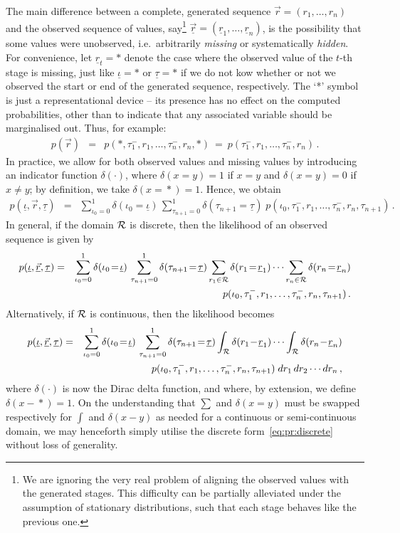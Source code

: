 \documentclass[a4paper]{article}
\newcommand{\ui}{\underline{\iota}}
\newcommand{\ut}{\underline{\tau}}
\newcommand{\ur}{\underline{r}}
\newcommand{\vr}{\vec{r}}
\newcommand{\uvr}{\underline{\vr}}
\newcommand{\tm}{\tau^{-}}
\begin{document}
The main difference between a complete, generated sequence $\vr=(r_1,\ldots,r_n)$
and the observed sequence of values, say\footnote{We are ignoring the very real problem
of aligning the observed values with the generated stages. This difficulty can be partially alleviated under the assumption of stationary distributions, such that each stage behaves
like the previous one.} 
$\uvr=(\ur_1,\ldots,\ur_n)$, 
is the possibility that some values were unobserved, i.e.\ arbitrarily {\em missing} or systematically {\em hidden}.
For convenience, let $\ur_t=*$ denote the case where the  observed value of the $t$-th stage is missing,
just like $\ui=*$ or $\ut=*$ if we do not kow whether or not we observed the start or end of the generated sequence,
respectively.
The `*' symbol is just a representational device -- its presence has no effect on the computed probabilities, other than to indicate that any associated variable should be marginalised out. Thus, for example:
\begin{eqnarray}
p(\vr) 
& = & p(*,\tm_1,r_1,\ldots,\tm_n,r_n,*)~=~p(\tm_1,r_1,\ldots,\tm_n,r_n)\,.
\end{eqnarray}
In practice, we allow for both observed values and missing values by introducing an indicator function $\delta(\cdot)$,
where $\delta(x\!=\!y)=1$ if $x=y$ and $\delta(x\!=\!y)=0$ if $x\ne y$;  by definition, we take $\delta(x\!=\!*)=1$.
Hence, we obtain
\begin{eqnarray}
p(\ui,\vr,\ut) 
& = & 
\sum_{\iota_0=0}^{1}\delta(\iota_0\!=\!\ui)
\,\sum_{\tau_{n+1}=0}^{1}\delta(\tau_{n+1}\!=\!\ut)\;
p(\iota_0,\tm_1,r_1,\ldots,\tm_n,r_n,\tau_{n+1})\,.
\end{eqnarray}
In general, if the domain ${\cal R}$  is discrete, then the likelihood of an observed sequence is given by
\begin{eqnarray}
p(\ui,\uvr,\ut) 
& = & 
\sum_{\iota_0=0}^{1}\delta(\iota_0\!=\!\ui)
\,\sum_{\tau_{n+1}=0}^{1}\delta(\tau_{n+1}\!=\!\ut)
\sum_{r_1\in{\cal R}} \delta(r_1\!=\!\ur_1)
\cdots\sum_{r_n\in{\cal R}} \delta(r_n\!=\!\ur_n)
\nonumber\\
&& \hspace*{5mm}
p(\iota_0,\tm_1,r_1,\ldots,\tm_n,r_n,\tau_{n+1})\,.
\label{eq:pr:discrete}
\end{eqnarray}
Alternatively, if ${\cal R}$ is continuous, then the likelihood becomes
\begin{eqnarray}
p(\ui,\uvr,\ut) 
& = & 
\sum_{\iota_0=0}^{1}\delta(\iota_0\!=\!\ui)
\,\sum_{\tau_{n+1}=0}^{1}\delta(\tau_{n+1}\!=\!\ut)
\int_{{\cal R}} \delta(r_1\!-\!\ur_1)
\cdots\int_{{\cal R}} \delta(r_n\!-\!\ur_n)
\nonumber\\
&& \hspace*{5mm}
p(\iota_0,\tm_1,r_1,\ldots,\tm_n,r_n,\tau_{n+1})
\;dr_1\,dr_2\cdots dr_n
\,,
\end{eqnarray}
where $\delta(\cdot)$ is now the Dirac delta function, and where, by extension, we define $\delta(x\!-\!*)=1$.
On the understanding that $\sum$ and $\delta(x\!=\!y)$ must be swapped respectively for $\int$ and $\delta(x\!-\!y)$ as needed for a continuous 
or semi-continuous domain, we may henceforth simply utilise the discrete form~\eqref{eq:pr:discrete} without loss of generality.
\end{document}

